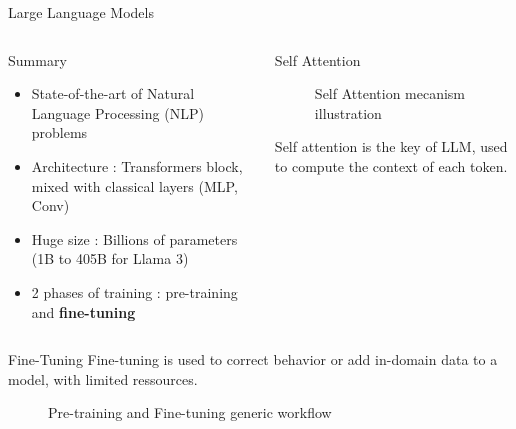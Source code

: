 \begin{frame}{Large Language Models}
\begin{columns}
      
    \begin{column}[t]{0.4\textwidth}
    \begin{block}{Summary}
    
        \begin{itemize}
            \item State-of-the-art of Natural Language Processing (NLP) problems
            \item Architecture : Transformers\cite{NIPS2017_3f5ee243} block, mixed with classical layers (MLP, Conv)
            \item Huge size : Billions of parameters (1B to 405B for Llama 3)
            \item 2 phases of training : pre-training and \textbf{fine-tuning}
        \end{itemize}
            

    \end{block}
    \end{column}
        
    \begin{column}[t]{0.55\textwidth}
    \begin{block}{Self Attention }

        \begin{figure}
            \centering
            
            \caption{Self Attention mecanism illustration}
        \end{figure}
    
        Self attention is the key of LLM, used to compute the context of each token.
    \end{block}  
    \end{column}
         
\end{columns}
\end{frame}


\begin{frame}{Fine-Tuning}
    Fine-tuning is used to correct behavior or add in-domain data to a model, with limited ressources. 


    \begin{figure}
        \centering
        
        \caption{Pre-training and Fine-tuning generic workflow}
    \end{figure}  
        

    
\end{frame}

